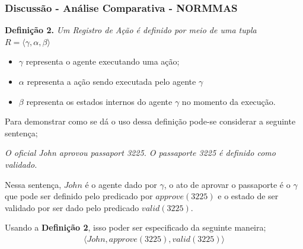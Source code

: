 \documentclass{beamer}
\begin{document}
\begin{frame}
	\frametitle{Discussão - Análise Comparativa - NORMMAS}
\textbf{Definição 2.} \textit{Um Registro de Ação é definido por meio de uma tupla} $R = \langle \gamma,\alpha,\beta \rangle$
	\begin{itemize}
	    \item $\gamma$ representa o agente executando uma ação;
	    \item $\alpha$ representa a ação sendo executada pelo agente $\gamma$
	    \item $\beta$ representa os estados internos do agente $\gamma$ no momento da execução.
	\end{itemize}

	Para demonstrar como se dá o uso dessa definição pode-se considerar a seguinte sentença;

	\textit{O oficial John aprovou passaport 3225. O passaporte 3225 é definido como validado.}

	Nessa sentença, $John$ é o agente dado por $\gamma$, o ato de aprovar o passaporte é o $\gamma$ que pode ser definido pelo predicado por $approve(3225)$ e o estado de ser validado por ser dado pelo predicado $valid(3225)$.  

	Usando a \textbf{Definição 2}, isso poder ser especificado da seguinte maneira; 
	\begin{eqnarray}
	    \langle John, approve(3225), valid(3225)\rangle
	\end{eqnarray}
\end{frame}
\end{document}
